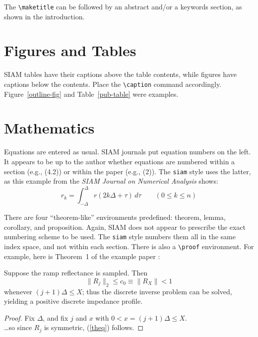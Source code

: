 The \verb|\maketitle| can be followed by an abstract and/or a keywords
section, as shown in the introduction.

\section{Figures and Tables}
SIAM tables have their captions above the table contents,
while figures have captions below the contents.
Place the \verb|\caption| command accordingly.
Figure~\ref{outline-fig} and Table~\ref{pub-table}
were examples.

\section{Mathematics}
Equations are entered as usual.
SIAM journals put equation numbers on the left.
It appears to be up to the author whether equations are numbered
within a section (e.g., (4.2)) or within the paper (e.g., (2)).
The {\tt siam} style uses the latter, as this example from
the {\em SIAM Journal on Numerical Analysis\/}
\cite{bube} shows:
\begin{equation}
r_k=\int_{-\Delta}^{\Delta} r(2k\Delta+\tau)\,d\tau\qquad (0\le k \le n)
\end{equation}

There are four ``theorem-like'' environments predefined:
theorem, lemma, corollary, and proposition.
Again, SIAM does not appear to prescribe the exact numbering scheme
to be used.
The {\tt siam} style numbers them all in the same index space, and
not within each section.
There is also a \verb|\proof| environment.
For example, here is Theorem~1 of the example paper \cite{bube}:
\begin{theorem}
Suppose the ramp reflectance is sampled. Then
\begin{equation}\label{theq}
\|R_j\|_2 \le c_0 \equiv \|R_X\| < 1
\end{equation}
whenever $(j+1)\Delta\le X$;
thus the discrete inverse problem can be solved,
yielding a positive discrete impedance profile.
\end{theorem}
\begin{proof}
Fix $\Delta$, and fix $j$ and $x$ with $0<x=(j+1)\Delta \le X$.\\
\dots so since $R_j$ is symmetric, (\ref{theq}) follows.
\end{proof}

